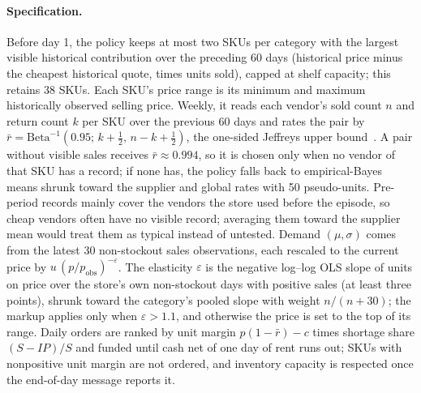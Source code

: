 \paragraph{Specification.}
Before day 1, the policy keeps at most two SKUs per category with the largest visible historical contribution over the preceding 60 days (historical price minus the cheapest historical quote, times units sold), capped at shelf capacity; this retains 38 SKUs. Each SKU's price range is its minimum and maximum historically observed selling price. Weekly, it reads each vendor's sold count $n$ and return count $k$ per SKU over the previous 60 days and rates the pair by $\bar r=\mathrm{Beta}^{-1}(0.95;\,k+\tfrac12,\,n-k+\tfrac12)$, the one-sided Jeffreys upper bound~\citep{brown2001interval}. A pair without visible sales receives $\bar r\approx0.994$, so it is chosen only when no vendor of that SKU has a record; if none has, the policy falls back to empirical-Bayes means shrunk toward the supplier and global rates with 50 pseudo-units. Pre-period records mainly cover the vendors the store used before the episode, so cheap vendors often have no visible record; averaging them toward the supplier mean would treat them as typical instead of untested. Demand $(\mu,\sigma)$ comes from the latest 30 non-stockout sales observations, each rescaled to the current price by $u\,(p/p_{\mathrm{obs}})^{-\varepsilon}$. The elasticity $\varepsilon$ is the negative log--log OLS slope of units on price over the store's own non-stockout days with positive sales (at least three points), shrunk toward the category's pooled slope with weight $n/(n+30)$; the markup applies only when $\varepsilon>1.1$, and otherwise the price is set to the top of its range. Daily orders are ranked by unit margin $p(1-\bar r)-c$ times shortage share $(S-IP)/S$ and funded until cash net of one day of rent runs out; SKUs with nonpositive unit margin are not ordered, and inventory capacity is respected once the end-of-day message reports it.

